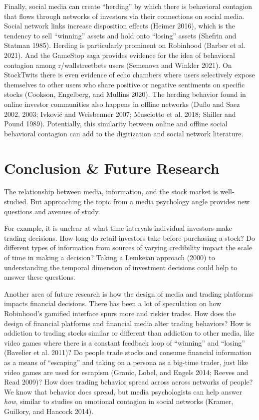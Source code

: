 \documentclass[12pt,]{article}
\begin{document}
Finally, social media can create ``herding'' by which there is
behavioral contagion that flows through networks of investors via their
connections on social media. Social network links increase disposition
effects (Heimer 2016), which is the tendency to sell ``winning'' assets
and hold onto ``losing'' assets (Shefrin and Statman 1985). Herding is
particularly prominent on Robinhood (Barber et al. 2021). And the
GameStop saga provides evidence for the idea of behavioral contagion
among r/wallstreetbets users (Semenova and Winkler 2021). On StockTwits
there is even evidence of echo chambers where users selectively expose
themselves to other users who share positive or negative sentiments on
specific stocks (Cookson, Engelberg, and Mullins 2020). The herding
behavior found in online investor communities also happens in offline
networks (Duflo and Saez 2002, 2003; Ivković and Weisbenner 2007;
Musciotto et al. 2018; Shiller and Pound 1989). Potentially, this
similarity between online and offline social behavioral contagion can
add to the digitization and social network literature.

\hypertarget{conclusion-future-research}{%
\section{Conclusion \& Future
Research}\label{conclusion-future-research}}

The relationship between media, information, and the stock market is
well-studied. But approaching the topic from a media psychology angle
provides new questions and avenues of study.

For example, it is unclear at what time intervals individual investors
make trading decisions. How long do retail investors take before
purchasing a stock? Do different types of information from sources of
varying credibility impact the scale of time in making a decision?
Taking a Lemkeian approach (2000) to understanding the temporal
dimension of investment decisions could help to answer these questions.

Another area of future research is how the design of media and trading
platforms impacts financial decisions. There has been a lot of
speculation on how Robinhood's gamified interface spurs more and riskier
trades. How does the design of financial platforms and financial media
alter trading behaviors? How is addiction to trading stocks similar or
different than addiction to other media, like video games where there is
a constant feedback loop of ``winning'' and ``losing'' (Bavelier et al.
2011)? Do people trade stocks and consume financial information as a
means of ``escaping'' and taking on a persona as a big-time trader, just
like video games are used for escapism (Granic, Lobel, and Engels 2014;
Reeves and Read 2009)? How does trading behavior spread across across
networks of people? We know that behavior does spread, but media
psychologists can help answer \emph{how}, similar to studies on
emotional contagion in social networks (Kramer, Guillory, and Hancock
2014).
\end{document}
